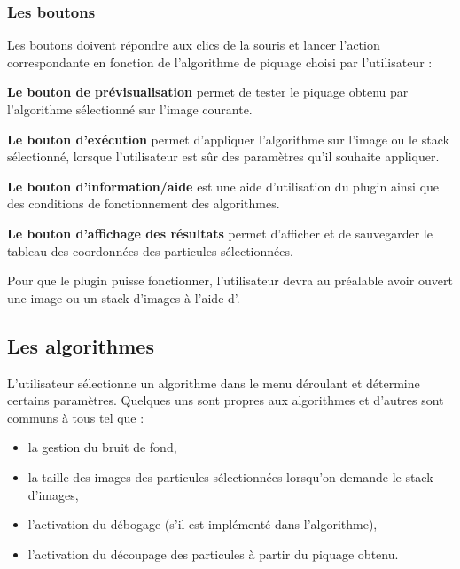 \subsubsection{Les boutons}

Les boutons doivent répondre aux clics de la souris et lancer l'action correspondante en fonction de l'algorithme de piquage choisi par l'utilisateur :

\begin{description}
\item \textbf{Le bouton de prévisualisation} permet de tester le piquage obtenu par l'algorithme sélectionné sur l'image courante.
\item \textbf{Le bouton d'exécution} permet d'appliquer l'algorithme sur l'image ou le stack sélectionné, lorsque l'utilisateur est s\^ur des paramètres qu'il souhaite appliquer.
\item \textbf{Le bouton d'information/aide} est une aide d'utilisation du plugin ainsi que des conditions de fonctionnement des algorithmes.
\item \textbf{Le bouton d'affichage des résultats} permet d'afficher et de sauvegarder le tableau des coordonnées des particules sélectionnées.%
\end{description}
Pour que le plugin puisse fonctionner, l'utilisateur devra au préalable avoir ouvert une image ou un stack d'images à l'aide d'\imj.
\pagebreak

\subsection{Les algorithmes}

L'utilisateur sélectionne un algorithme dans le menu déroulant et détermine certains paramètres. Quelques uns sont propres aux algorithmes et d'autres sont communs à tous tel que :
\begin{itemize}
\item la gestion du bruit de fond,
\item la taille des images des particules sélectionnées lorsqu'on demande le stack d'images,
\item l'activation du débogage (s'il est implémenté dans l'algorithme),
\item l'activation du découpage des particules à partir du piquage obtenu.
\end{itemize}

